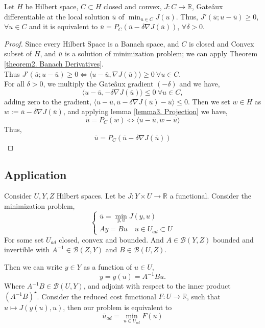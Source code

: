\begin{theorem}
Let $H$ be Hilbert space, $C \subset H$ closed and convex, $J: C \rightarrow \mathbb{R}$, Gate\^aux differentiable at the local solution $\overline{u}$ of $\min_{u\in C} J(u)$. Thus, $J'(\overline{u};u-\overline{u}) \geq 0$, $\forall u \in C$ and it is equivalent to $ \overline{u}=P_C(\overline{u}-\delta\nabla J(\overline{u}))$, $\forall \delta >0$. 
\begin{proof} 
Since every Hilbert Space is a Banach space, and $C$ is closed and Convex subset of $H$, and $\overline{u}$ is a solution of minimization problem; we can apply Theorem \ref{theorem2. Banach Derivatives}.\\
 Thus	$J'\left(\overline{u}; u-\overline{u}\right)\geq 0 \iff \langle u-\overline{u}, \nabla J(\overline{u})\rangle \geq 0 \ \forall u \in C$. \\
For all $\delta >0$, we multiply the Gate\^aux gradient  $(-\delta)$ and we have,
\[\langle u-\overline{u}, -\delta \nabla J(\overline{u}) \rangle \leq 0 \ \forall u \in C,\] adding zero to the gradient, $ \langle u-\overline{u}, \overline{u}-\delta\nabla J(\overline{u})-\overline{u}\rangle \leq 0$. Then we set $w \in H$ as $w:= \overline{u}-\delta  \nabla J(\overline{u})$, and applying lemma \ref{lemma3. Projection} we have,
\[
	\overline{u}=P_C(w)	\iff \langle u -\overline{u},w-\overline{u}\rangle
\]
Thus, 
	\[
		\overline{u}=P_C(\overline{u}-\delta \nabla J(\overline{u}))
	\]
\end{proof}
\end{theorem}
\subsection{Application}
Consider $U, Y, Z$ Hilbert spaces. Let be  $J: Y\times U \rightarrow \mathbb{R}$ a functional. Consider the minimization problem,
\begin{equation*}
	\left\lbrace
	\begin{array}{l}
	\overline{u}=\underset{y,u}{\min} J(y,u) \\
	Ay=Bu \quad u \in U_{ad} \subset U
	\end{array}
	\right.
\end{equation*}
For some set $U_{ad}$ closed, convex and bounded. And $A \in \mathcal{B}(Y,Z)$ bounded and invertible with $A^{-1}\in \mathcal{B}(Z, Y)$ and $B\in \mathcal{B}(U, Z)$.

Then we can write $y \in Y$ as a function of $u \in U$,
\[
y=y(u)=A^{-1}Bu.
\]
Where $A^{-1}B \in \mathcal{B}(U, Y)$, and adjoint with respect to the inner product $(A^{-1}B)^\star$. Consider the reduced cost functional  $F:U\rightarrow \mathbb{R}$, such that $u\mapsto J(y(u), u)$, then our problem is equivalent to
\[
	\overline{u}_{ad}=\min_{u \in U_{ad}} F(u) 
\]

